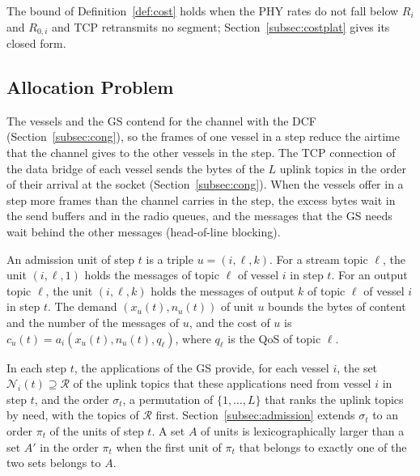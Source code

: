 The bound of Definition~\ref{def:cost} holds when the PHY rates do not fall below $R_i$ and $R_{0,i}$ and TCP retransmits no segment; Section~\ref{subsec:costplat} gives its closed form.

\subsection{Allocation Problem}\label{subsec:alloc}

The vessels and the GS contend for the channel with the DCF (Section~\ref{subsec:cong}), so the frames of one vessel in a step reduce the airtime that the channel gives to the other vessels in the step. The TCP connection of the data bridge of each vessel sends the bytes of the $L$ uplink topics in the order of their arrival at the socket (Section~\ref{subsec:cong}). When the vessels offer in a step more frames than the channel carries in the step, the excess bytes wait in the send buffers and in the radio queues, and the messages that the GS needs wait behind the other messages (head-of-line blocking).

\begin{definition}\label{def:unit}
An admission unit of step $t$ is a triple $u = (i, \ell, k)$. For a stream topic $\ell$, the unit $(i, \ell, 1)$ holds the messages of topic $\ell$ of vessel $i$ in step $t$. For an output topic $\ell$, the unit $(i, \ell, k)$ holds the messages of output $k$ of topic $\ell$ of vessel $i$ in step $t$. The demand $(x_u(t), n_u(t))$ of unit $u$ bounds the bytes of content and the number of the messages of $u$, and the cost of $u$ is $c_u(t) = a_i(x_u(t), n_u(t), q_\ell)$, where $q_\ell$ is the QoS of topic $\ell$.
\end{definition}

In each step $t$, the applications of the GS provide, for each vessel $i$, the set $\mathcal{N}_i(t) \supseteq \mathcal{R}$ of the uplink topics that these applications need from vessel $i$ in step $t$, and the order $\sigma_t$, a permutation of $\{1, \dots, L\}$ that ranks the uplink topics by need, with the topics of $\mathcal{R}$ first. Section~\ref{subsec:admission} extends $\sigma_t$ to an order $\pi_t$ of the units of step $t$. A set $A$ of units is lexicographically larger than a set $A'$ in the order $\pi_t$ when the first unit of $\pi_t$ that belongs to exactly one of the two sets belongs to $A$.

